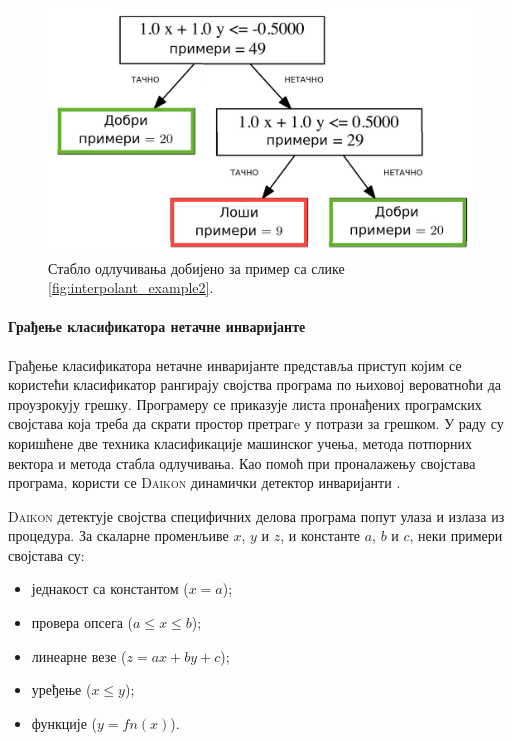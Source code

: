 \documentclass[a4paper]{article}
\begin{document}
{\begin{figure}[h!]
\begin{center}
\includegraphics[scale=0.12]{./slike/stablo_odlucivanja.png}
\end{center}
    \caption{Стабло одлучивања добијено за пример са слике \ref{fig:interpolant_example2}.}
\label{fig:interpolant_dt}
\end{figure}

\paragraph{Грађење класификатора нетачне инваријанте}

Грађење класификатора нетачне инваријанте \cite{Brun04findinglatent} представља приступ којим се користећи класификатор рангирају
својства програма по њиховој вероватноћи да проузрокују грешку. Програмеру се приказује листа пронађених
програмских својстава која треба да скрати простор претрагe у потрази за грешком. У раду су коришћене две техника класификације
машинског учења, метода потпорних вектора и метода стабла одлучивања. Као помоћ при проналажењу својстава програма, користи
се \textsc{Daikon} динамички детектор инваријанти \cite{Daikon}.

\textsc{Daikon} детектује својства специфичних делова програма попут улаза и излаза из процедура.
За скаларне променљиве $x$, $y$ и $z$, и константе $a$, $b$ и $c$, неки примери својстава су:
\begin{itemize}
    \item једнакост са константом ($x = a$);
    \item провера опсега ($a \leq x \leq b$);
    \item линеарне везе ($z = ax + by + c$);
    \item уређење ($x \leq y$);
    \item функције ($y = fn(x)$).
\end{itemize}

}
\end{document}
